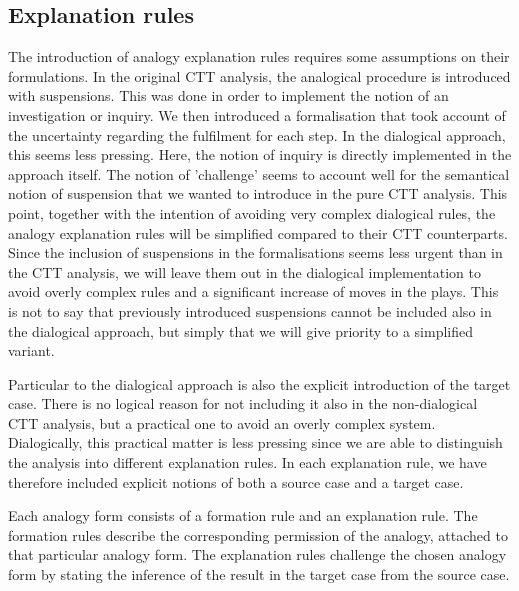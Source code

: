			
		
		\subsection{Explanation rules}
		
			The introduction of analogy explanation rules requires some assumptions on their formulations. In the original CTT analysis, the analogical procedure is introduced with suspensions. This was done in order to implement the notion of an investigation or inquiry. We then introduced a formalisation that took account of the uncertainty regarding the fulfilment for each step. In the dialogical approach, this seems less pressing. Here, the notion of inquiry is directly implemented in the approach itself. The notion of 'challenge' seems to account well for the semantical notion of suspension that we wanted to introduce in the pure CTT analysis. This point, together with the intention of avoiding very complex dialogical rules, the analogy explanation rules will be simplified compared to their CTT counterparts. Since the inclusion of suspensions in the formalisations seems less urgent than in the CTT analysis, we will leave them out in the dialogical implementation to avoid overly complex rules and a significant increase of moves in the plays. This is not to say that previously introduced suspensions cannot be included also in the dialogical approach, but simply that we will give priority to a simplified variant. 
			
			Particular to the dialogical approach is also the explicit introduction of the target case. There is no logical reason for not including it also in the non-dialogical CTT analysis, but a practical one to avoid an overly complex system. Dialogically, this practical matter is less pressing since we are able to distinguish the analysis into different explanation rules. In each explanation rule, we have therefore included explicit notions of both a source case and a target case. 
			
			Each analogy form consists of a formation rule and an explanation rule. The formation rules describe the corresponding permission of the analogy, attached to that particular analogy form. The explanation rules challenge the chosen analogy form by stating the inference of the result in the target case from the source case. 
			
